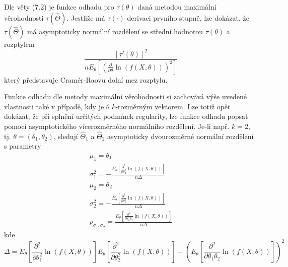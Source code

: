 Dle věty (7.2) je funkce odhadu pro $\tau(\theta)$ daná metodou maximální věrohodnosti $\tau(\hat{\Theta})$. Jestliže má $\tau(\cdot)$ derivaci prvního stupně, lze dokázat, že $\tau(\hat{\Theta})$ má asymptoticky normální rozdělení se střední hodnotou $\tau(\theta)$ a rozptylem
\begin{equation*}
\frac{[\tau'(\theta)]^2}{n E_{\theta}\left[\left(\frac{\partial}{\partial \theta}\ln(f(X, \theta))\right)^2\right]}
\end{equation*}
který představuje Cramér-Raovu dolní mez rozptylu.

Funkce odhadu dle metody maximální věrohodnosti si zachovává výše uvedené vlastnosti také v případě, kdy je $\theta$ $k$-rozměrným vektorem. Lze totiž opět dokázat, že při splnění určitých podmínek regularity, lze funkce odhadu popsat pomocí asymptotického vícerozměrného normálního rozdělení. Je-li např. $k = 2$, tj. $\theta = (\theta_1, \theta_2)$, sledují $\hat{\Theta}_1$ a $\hat{\Theta}_2$ asymptoticky dvourozměrné normální rozdělení s parametry
\begin{gather*}
\mu_1 = \theta_1\\
\sigma_1^2 = - \frac{E_{\theta}\left[\frac{\partial^2}{\partial \theta_2^2}\ln(f(X, \theta))\right]}{n \Delta}\\
\mu_2 = \theta_2\\
\sigma_2^2 = - \frac{E_{\theta}\left[\frac{\partial^2}{\partial \theta_1^2}\ln(f(X, \theta))\right]}{n \Delta}\\
\rho_{\sigma_1, \sigma_2} = \frac{E_{\theta}\left[\frac{\partial^2}{\partial \theta_2 \theta_1}\ln(f(X, \theta))\right]}{n \Delta}
\end{gather*}
kde
\begin{equation*}
\Delta = E_{\theta}\left[\frac{\partial^2}{\partial \theta_1^2}\ln(f(X, \theta))\right]E_{\theta}\left[\frac{\partial^2}{\partial \theta_2^2}\ln(f(X, \theta))\right] - \left(E_{\theta}\left[\frac{\partial^2}{\partial \theta_1 \theta_2}\ln(f(X, \theta))\right]\right)^2
\end{equation*}

